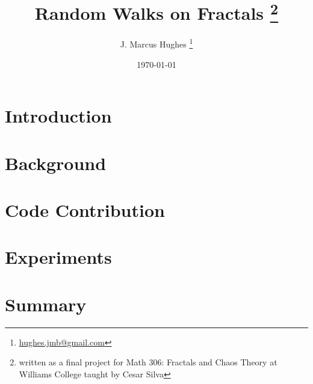 \documentclass{article}
\title{Random Walks on Fractals \thanks{written as a final project for Math 306: Fractals and Chaos Theory at Williams College taught by Cesar Silva}}
\date{\today}
\author{J. Marcus Hughes \thanks{\href{mailto:hughes.jmb@gmail.com}{hughes.jmb@gmail.com}}}
\begin{document}
\maketitle
\section{Introduction}

\section{Background}

\section{Code Contribution}

\section{Experiments}

\section{Summary}



\end{document}
